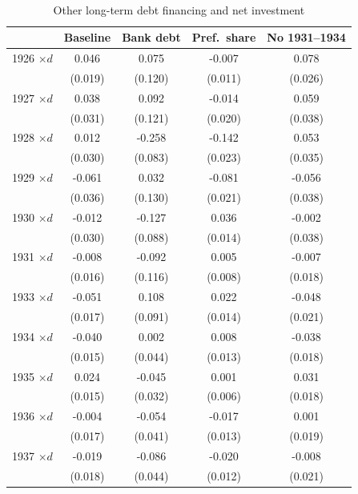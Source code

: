 \begin{table}[p]\centering
\caption{\\ Other long-term debt financing and net investment} 
\footnotesize \label{tab:otherd} \renewcommand{\arraystretch}{1.2}
\begin{tabular}{lcccc}
\toprule
& Baseline & Bank debt & Pref.\ share & No 1931--1934 \\
\midrule
1926 $\times d$ & 0.046\sym{**} & 0.075 & -0.007 & 0.078\sym{***} \\
                & (0.019)       & (0.120) & (0.011) & (0.026) \\
1927 $\times d$ & 0.038 & 0.092 & -0.014 & 0.059 \\
                & (0.031) & (0.121) & (0.020) & (0.038) \\
1928 $\times d$ & 0.012 & -0.258\sym{***} & -0.142\sym{***} & 0.053 \\
                & (0.030) & (0.083) & (0.023) & (0.035) \\
1929 $\times d$ & -0.061 & 0.032 & -0.081\sym{***} & -0.056 \\
                & (0.036) & (0.130) & (0.021) & (0.038) \\
1930 $\times d$ & -0.012 & -0.127 & 0.036\sym{**} & -0.002 \\
                & (0.030) & (0.088) & (0.014) & (0.038) \\
1931 $\times d$ & -0.008 & -0.092 & 0.005 & -0.007 \\
                & (0.016) & (0.116) & (0.008) & (0.018) \\
1933 $\times d$ & -0.051\sym{**} & 0.108 & 0.022 & -0.048\sym{**} \\
                & (0.017) & (0.091) & (0.014) & (0.021) \\
1934 $\times d$ & -0.040\sym{**} & 0.002 & 0.008 & -0.038\sym{*} \\
                & (0.015) & (0.044) & (0.013) & (0.018) \\
1935 $\times d$ & 0.024 & -0.045 & 0.001 & 0.031 \\
                & (0.015) & (0.032) & (0.006) & (0.018) \\
1936 $\times d$ & -0.004 & -0.054 & -0.017 & 0.001 \\
                & (0.017) & (0.041) & (0.013) & (0.019) \\
1937 $\times d$ & -0.019 & -0.086\sym{*} & -0.020 & -0.008 \\
                & (0.018) & (0.044) & (0.012) & (0.021) \\

\end{tabular}
\end{table}
